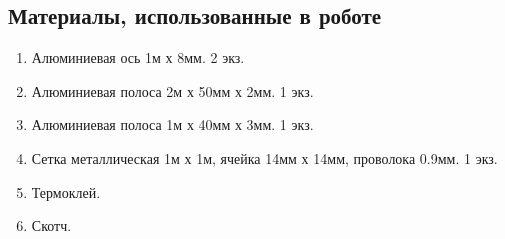 
\subsection{Материалы, использованные в роботе}

\begin{enumerate}
	\item Алюминиевая ось 1м х 8мм. 2 экз.
	
	\item Алюминиевая полоса 2м х 50мм х 2мм. 1 экз.
	
	\item Алюминиевая полоса 1м х 40мм х 3мм. 1 экз.
	
	\item Сетка металлическая 1м х 1м, ячейка 14мм х 14мм, проволока 0.9мм. 1 экз.
	
	\item Термоклей.
	
	\item Скотч.
\end{enumerate}
\newpage


